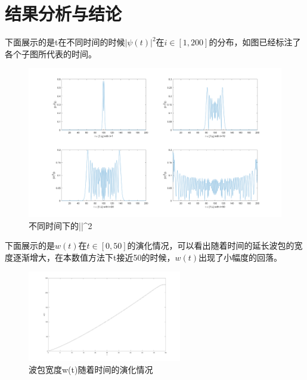 \documentclass[UTF8,a4paper,10pt]{ctexart}
\begin{document}
\section{结果分析与结论}
下面展示的是t在不同时间的时候$|\psi(t)|^2$在$i\in [1,200]$的分布，如图已经标注了各个子图所代表的时间。\newline

	\begin{figure}[!htbp]
		\centering
		\includegraphics[width=1\textwidth,height=0.6\textwidth]{pictures/psi2.png}
		\caption{不同时间下的|\psi|^2} \label{psi2}
	\end{figure}

  下面展示的是$w(t)$在$t\in [0,50]$的演化情况，可以看出随着时间的延长波包的宽度逐渐增大，在本数值方法下t接近50的时候，$w(t)$出现了小幅度的回落。\newline


	\begin{figure}[!htbp]
		\centering
		\includegraphics[width=0.6\textwidth,height=0.4\textwidth]{pictures/wt.png}
		\caption{波包宽度w(t)随着时间的演化情况} \label{wt}
	\end{figure}
\end{document}

